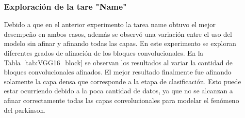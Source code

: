 \documentclass[10pt, a4paper]{article}
\begin{document}
\subsubsection*{Exploración de la tare "Name"}

Debido a que en el anterior experimento la tarea name obtuvo el mejor desempeño en ambos casos, además
se observó una variación entre el uso del modelo sin afinar y afinando todas las capas. En este experimento
se exploran diferentes grados de afinación de los bloques convolucionales. En la Tabla~\ref*{tab:VGG16_block}
se observan los resultados al variar la cantidad de bloques convolucionales afinados. El mejor resultado 
finalmente fue afinando solamente la capa densa que corresponde a la etapa de clasificación. Esto puede estar 
ocurriendo debido a la poca cantidad de datos, ya que no se alcanzan a afinar correctamente todas las capas
convolucionales para modelar el fenómeno del parkinson.

\begin{table}[h!!]
\caption{Resultados de la exploración de tareas afinando todos los bloques convolucionales 
del modelo VGG16.}
\centering
\label{tab:VGG16_block}
\end{table}
\end{document}
